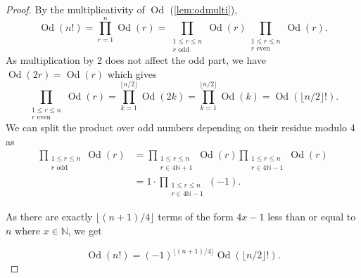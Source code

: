 \documentclass[12pt]{amsart}
\theoremstyle{definition}
\numberwithin{equation}{section}
\DeclareMathOperator{\Od}{Od}
\begin{document}
\begin{proof}
    By the multiplicativity of $\Od$ (\cref{lem:odmulti}),
\[
\Od(n!) = \prod\limits_{r=1}^n \Od(r) = \prod\limits_{\substack{1 \leq r \leq n\\ r \text{ odd}}} \Od(r) \prod\limits_{\substack{1 \leq r \leq n\\ r \text{ even}}} \Od(r).
\]
As multiplication by 2 does not affect the odd part, we have $\Od(2r) = \Od(r)$ which gives \[\prod\limits_{\substack{1 \leq r \leq n\\ r \text{ even}}} \Od(r) = \prod\limits_{k=1}^{\lfloor n/2 \rfloor}\Od(2k) =  \prod\limits_{k=1}^{\lfloor n/2 \rfloor}\Od(k) =\Od(\lfloor n/2 \rfloor!).\]
We can split the product over odd numbers depending on their residue modulo 4 as
\begin{align*}
\prod\limits_{\substack{1 \leq r \leq n\\ r \text{ odd}}} \Od(r) &= \prod\limits_{\substack{1 \leq r \leq n\\ r \in 4\mathbb{N}+1}} \Od(r) \prod\limits_{\substack{1 \leq r \leq n\\ r \in 4\mathbb{N}-1}} \Od(r)\\
&= 1\cdot \prod\limits_{\substack{1 \leq r \leq n\\ r \in 4\mathbb{N}-1}} (-1).
\end{align*}
 

As there are exactly $\lfloor (n+1)/4\rfloor$ terms of the form $4x-1$ less than or equal to $n$ where $x\in \mathbb{N}$, we get

\[
\Od(n!) = (-1)^{\lfloor (n+1)/4\rfloor}\Od(\lfloor n/2 \rfloor!).
\]
\end{proof}
\end{document}
